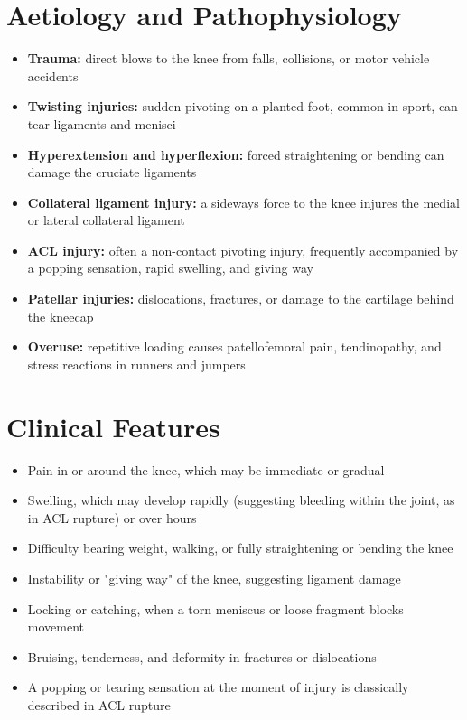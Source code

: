 \section*{Aetiology and Pathophysiology}
\begin{itemize}
    \item \textbf{Trauma:} direct blows to the knee from falls, collisions, or motor vehicle accidents
    \item \textbf{Twisting injuries:} sudden pivoting on a planted foot, common in sport, can tear ligaments and menisci
    \item \textbf{Hyperextension and hyperflexion:} forced straightening or bending can damage the cruciate ligaments
    \item \textbf{Collateral ligament injury:} a sideways force to the knee injures the medial or lateral collateral ligament
    \item \textbf{ACL injury:} often a non-contact pivoting injury, frequently accompanied by a popping sensation, rapid swelling, and giving way
    \item \textbf{Patellar injuries:} dislocations, fractures, or damage to the cartilage behind the kneecap
    \item \textbf{Overuse:} repetitive loading causes patellofemoral pain, tendinopathy, and stress reactions in runners and jumpers
\end{itemize}

\section*{Clinical Features}
\begin{itemize}
    \item Pain in or around the knee, which may be immediate or gradual
    \item Swelling, which may develop rapidly (suggesting bleeding within the joint, as in ACL rupture) or over hours
    \item Difficulty bearing weight, walking, or fully straightening or bending the knee
    \item Instability or "giving way" of the knee, suggesting ligament damage
    \item Locking or catching, when a torn meniscus or loose fragment blocks movement
    \item Bruising, tenderness, and deformity in fractures or dislocations
    \item A popping or tearing sensation at the moment of injury is classically described in ACL rupture
\end{itemize}

